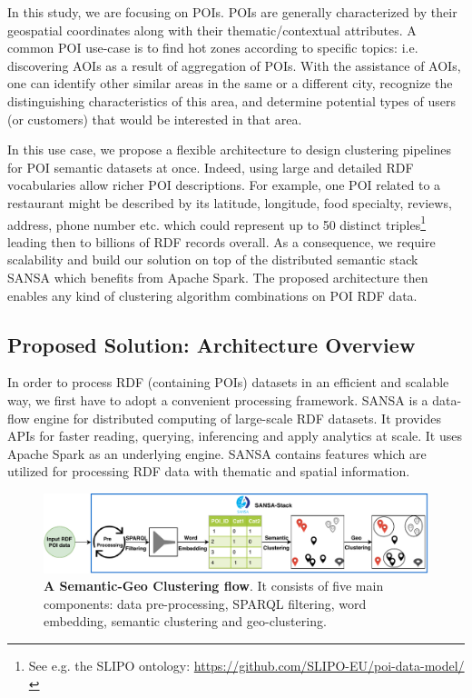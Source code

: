In this study, we are focusing on \gls{POI}s.
\gls{POI}s are generally characterized by their geospatial coordinates along with their thematic/contextual attributes.
A common \gls{POI} use-case is to find hot zones according to specific topics: i.e. discovering \gls{AOI}s as a result of aggregation of \gls{POI}s.
With the assistance of \gls{AOI}s, one can identify other similar areas in the same or a different city, recognize the distinguishing characteristics of this area, and determine potential types of users (or customers) that would be interested in that area.

In this use case, we propose a flexible architecture to design clustering pipelines for \gls{POI} semantic datasets at once.
Indeed, using large and detailed \gls{RDF} vocabularies allow richer \gls{POI} descriptions.
For example, one \gls{POI} related to a restaurant might be described by its latitude, longitude, food specialty, reviews, address, phone number etc. which could represent up to 50 distinct triples\footnote{\scriptsize See e.g. the SLIPO ontology: \url{https://github.com/SLIPO-EU/poi-data-model/}} leading then to billions of RDF records overall.
As a consequence, we require scalability and build our solution on top of the distributed semantic stack SANSA which benefits from Apache Spark.
The proposed architecture then enables any kind of clustering algorithm combinations on \gls{POI} \gls{RDF} data.

\subsection{Proposed Solution: Architecture Overview}
In order to process RDF (containing POIs) datasets in an efficient and scalable way, we first have to adopt a convenient processing framework.
SANSA is a data-flow engine for distributed computing of large-scale \gls{RDF} datasets. 
It provides \gls{API}s for faster reading, querying, inferencing and apply analytics at scale.
It uses Apache Spark as an underlying engine.
SANSA contains features which are utilized for processing \gls{RDF} data with thematic and spatial information.

\begin{figure}
    \centering
	\includegraphics[width=\textwidth]{images/7_implemenation_and_usecases/KmeansPaper8.pdf}
	\caption{\textbf{A Semantic-Geo Clustering flow}.
	It consists of five main components: data pre-processing, SPARQL filtering, word embedding, semantic clustering and geo-clustering.}
	\label{fig:imp-use-case-clustering}
\end{figure}

